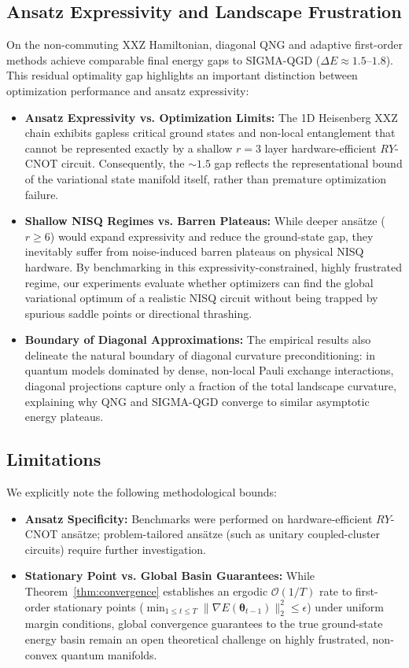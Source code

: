 \documentclass[11pt,a4paper]{article}
\begin{document}
\subsection{Ansatz Expressivity and Landscape Frustration}
On the non-commuting XXZ Hamiltonian, diagonal QNG and adaptive first-order methods achieve comparable final energy gaps to SIGMA-QGD ($\Delta E \approx 1.5\text{--}1.8$). This residual optimality gap highlights an important distinction between optimization performance and ansatz expressivity:
\begin{itemize}
    \item \textbf{Ansatz Expressivity vs. Optimization Limits:} The 1D Heisenberg XXZ chain exhibits gapless critical ground states and non-local entanglement that cannot be represented exactly by a shallow $r=3$ layer hardware-efficient $RY$-CNOT circuit. Consequently, the $\sim 1.5$ gap reflects the representational bound of the variational state manifold itself, rather than premature optimization failure.
    \item \textbf{Shallow NISQ Regimes vs. Barren Plateaus:} While deeper ans\"atze ($r \ge 6$) would expand expressivity and reduce the ground-state gap, they inevitably suffer from noise-induced barren plateaus on physical NISQ hardware. By benchmarking in this expressivity-constrained, highly frustrated regime, our experiments evaluate whether optimizers can find the global variational optimum of a realistic NISQ circuit without being trapped by spurious saddle points or directional thrashing.
    \item \textbf{Boundary of Diagonal Approximations:} The empirical results also delineate the natural boundary of diagonal curvature preconditioning: in quantum models dominated by dense, non-local Pauli exchange interactions, diagonal projections capture only a fraction of the total landscape curvature, explaining why QNG and SIGMA-QGD converge to similar asymptotic energy plateaus.
\end{itemize}

\subsection{Limitations}
We explicitly note the following methodological bounds:
\begin{itemize}
    \item \textbf{Ansatz Specificity:} Benchmarks were performed on hardware-efficient $RY$-CNOT ans\"atze; problem-tailored ans\"atze (such as unitary coupled-cluster circuits) require further investigation.
    \item \textbf{Stationary Point vs. Global Basin Guarantees:} While Theorem~\ref{thm:convergence} establishes an ergodic $\mathcal{O}(1/T)$ rate to first-order stationary points ($\min_{1 \le t \le T} \|\nabla E(\boldsymbol{\theta}_{t-1})\|_2^2 \le \epsilon$) under uniform margin conditions, global convergence guarantees to the true ground-state energy basin remain an open theoretical challenge on highly frustrated, non-convex quantum manifolds.
\end{itemize}
\end{document}
